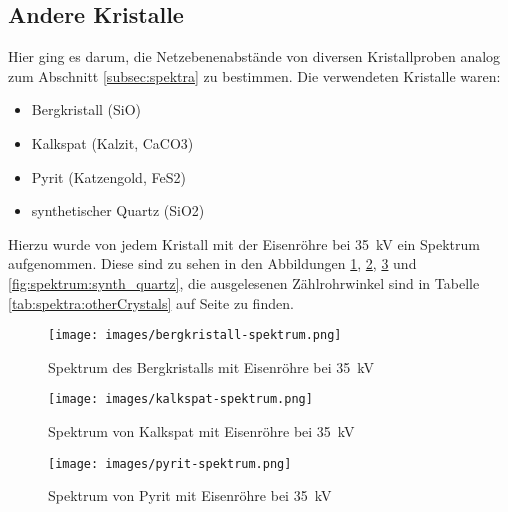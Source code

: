 \clearpage
\subsection{Andere Kristalle}
\label{subsec:othercrystals}

Hier  ging  es darum,  die  Netzebenenabst\"ande  von diversen  Kristallproben
analog  zum  Abschnitt   \ref{subsec:spektra}  zu  bestimmen. Die  verwendeten
Kristalle waren:

\begin{itemize}
    \item
        Bergkristall (SiO)
    \item
        Kalkspat (Kalzit, CaCO3)
    \item
        Pyrit (Katzengold, FeS2)
    \item
        synthetischer Quartz (SiO2)
\end{itemize}

Hierzu    wurde    von   jedem    Kristall    mit    der   Eisenr\"ohre    bei
\SI{35}{\kilo\volt}  ein   Spektrum  aufgenommen. Diese   sind  zu   sehen  in
den Abbildungen  \ref{fig:spektrum:bergkristall}, \ref{fig:spektrum:kalkspat},
\ref{fig:spektrum:pyrit} und \ref{fig:spektrum:synth_quartz}, die ausgelesenen
Z\"ahlrohrwinkel  sind in  Tabelle  \ref{tab:spektra:otherCrystals} auf  Seite
\pageref{tab:spektra:otherCrystals} zu finden.

\begin{figure}[h!]
    \centering
    \texttt{[image: images/bergkristall-spektrum.png]}
    \caption{Spektrum des Bergkristalls mit Eisenr\"ohre bei \SI{35}{\kilo\volt}}
    \label{fig:spektrum:bergkristall}
\end{figure}

\vspace{-1em}
\begin{figure}[h!]
    \centering
    \texttt{[image: images/kalkspat-spektrum.png]}
    \caption{Spektrum von Kalkspat  mit Eisenr\"ohre bei \SI{35}{\kilo\volt}}
    \label{fig:spektrum:kalkspat}
\end{figure}

\begin{figure}[h!]
    \centering
    \texttt{[image: images/pyrit-spektrum.png]}
    \caption{Spektrum von Pyrit  mit Eisenr\"ohre bei \SI{35}{\kilo\volt}}
    \label{fig:spektrum:pyrit}
\end{figure}

